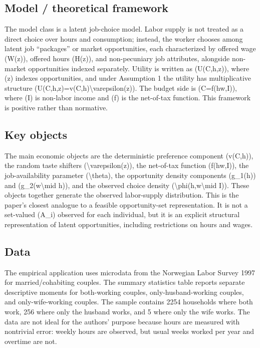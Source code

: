 \documentclass[11pt,a4paper]{article}
\begin{document}
\subsection*{Model / theoretical framework}
The model class is a latent job-choice model. Labor supply is not treated as a direct choice over hours and consumption; instead, the worker chooses among latent job “packages” or market opportunities, each characterized by offered wage (W(z)), offered hours (H(z)), and non-pecuniary job attributes, alongside non-market opportunities indexed separately. Utility is written as (U(C,h,z)), where (z) indexes opportunities, and under Assumption 1 the utility has multiplicative structure (U(C,h,z)=v(C,h)\textbackslash{}varepsilon(z)). The budget side is (C=f(hw,I)), where (I) is non-labor income and (f) is the net-of-tax function. This framework is positive rather than normative.

\subsection*{Key objects}
The main economic objects are the deterministic preference component (v(C,h)), the random taste shifters (\textbackslash{}varepsilon(z)), the net-of-tax function (f(hw,I)), the job-availability parameter (\textbackslash{}theta), the opportunity density components (g\_1(h)) and (g\_2(w\textbackslash{}mid h)), and the observed choice density (\textbackslash{}phi(h,w\textbackslash{}mid I)). These objects together generate the observed labor-supply distribution. This is the paper’s closest analogue to a feasible opportunity-set representation. It is not a set-valued (A\_i) observed for each individual, but it is an explicit structural representation of latent opportunities, including restrictions on hours and wages.

\subsection*{Data}
The empirical application uses microdata from the Norwegian Labor Survey 1997 for married/cohabiting couples. The summary statistics table reports separate descriptive moments for both-working couples, only-husband-working couples, and only-wife-working couples. The sample contains 2254 households where both work, 256 where only the husband works, and 5 where only the wife works. The data are not ideal for the authors’ purpose because hours are measured with nontrivial error: weekly hours are observed, but usual weeks worked per year and overtime are not.
\end{document}
